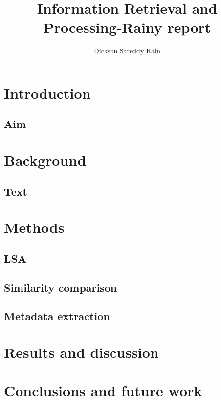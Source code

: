 \documentclass[a4paper,twocolumn,twoside]{article}
\begin{document}
 
	
	\title{Information Retrieval and Processing-Rainy report}
	\author{Dickson Sareddy Rain}  %
	\maketitle   
	
	\section{Introduction}
	\label{Introduction}
	\subsection{Aim}
	\label{aim}

	\section{Background}
	\label{Background}
	\subsection{Text}
	
	\section{Methods}
	\label{Methods}
	\subsection{LSA}
	\subsection{Similarity comparison}
	\subsection{Metadata extraction}
	
	

	
	\section{Results and discussion}


	\section{Conclusions and future work}

		
	
	\clearpage 
\end{document}

